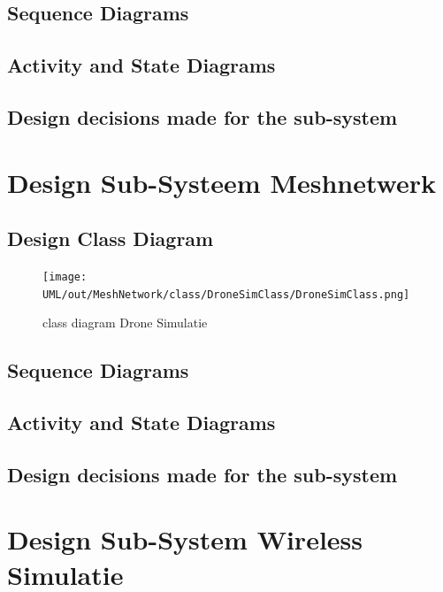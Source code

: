 \documentclass[a4paper, 11pt, oneside]{report}
\begin{document}
\subsection{Sequence Diagrams}
\label{DetailedDesign:DroneSimumlatie:sequence}
\subsection{Activity and State Diagrams}
\label{DetailedDesign:DroneSimumlatie:Activity}
\subsection{Design decisions made for the sub-system}

\section{Design Sub-Systeem Meshnetwerk}
\label{DetailedDesign:MeshNetwerk}
\subsection{Design Class Diagram}
\label{DetailedDesign:MeshNetwerk:class}
\label{DetailedDesign:DroneSimumlatie:class}
\begin{figure}[H]
	\begin{center}\texttt{[image: UML/out/MeshNetwork/class/DroneSimClass/DroneSimClass.png]}\end{center}
	\caption{class diagram Drone Simulatie}
	\label{fig:class:dronesimulatie}
\end{figure}
\subsection{Sequence Diagrams}
\label{DetailedDesign:MeshNetwerk:sequence}
\subsection{Activity and State Diagrams}
\label{DetailedDesign:MeshNetwerk:activity}
\subsection{Design decisions made for the sub-system}
\label{DetailedDesign:MeshNetwerk:decisions}

\section{Design Sub-System Wireless Simulatie}
\label{DetailedDesign:WirelessSimulatie}
\end{document}
